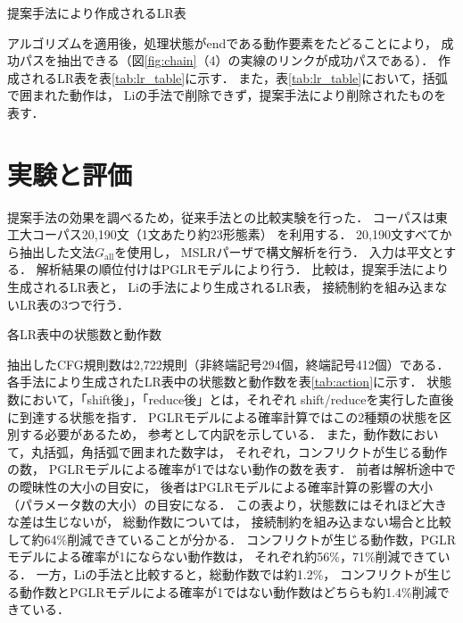 \documentclass[japanese]{jnlp_1.4}
\begin{document}
\begin{table}[b]
  \caption{提案手法により作成されるLR表}
  \label{tab:lr_table}

\end{table}

アルゴリズムを適用後，処理状態がendである動作要素をたどることにより，
成功パスを抽出できる（図\ref{fig:chain}（4）の実線のリンクが成功パスである）．
作成されるLR表を表\ref{tab:lr_table}に示す．
また，表\ref{tab:lr_table}において，括弧で囲まれた動作は，
Liの手法で削除できず，提案手法により削除されたものを表す．




\section{実験と評価}
\label{sec:evaluation}



提案手法の効果を調べるため，従来手法との比較実験を行った．
コーパスは東工大コーパス20,190文（1文あたり約23形態素）
\cite{noro:05} を利用する．
20,190文すべてから抽出した文法$G_{\mbox{all}}$を使用し，
MSLRパーザで構文解析を行う．
入力は平文とする．
解析結果の順位付けはPGLRモデルにより行う．
比較は，提案手法により生成されるLR表と，
Liの手法により生成されるLR表，
接続制約を組み込まないLR表の3つで行う．

\begin{table}[b]
  \caption{各LR表中の状態数と動作数}
  \label{tab:action}

\end{table}

抽出したCFG規則数は2,722規則（非終端記号294個，終端記号412個）である．
各手法により生成されたLR表中の状態数と動作数を表\ref{tab:action}に示す．
状態数において，「shift後」，「reduce後」とは，それぞれ
shift/reduceを実行した直後に到達する状態を指す．
PGLRモデルによる確率計算ではこの2種類の状態を区別する必要があるため，
参考として内訳を示している．
また，動作数において，丸括弧，角括弧で囲まれた数字は，
それぞれ，コンフリクトが生じる動作の数，
PGLRモデルによる確率が1ではない動作の数を表す．
前者は解析途中での曖昧性の大小の目安に，
後者はPGLRモデルによる確率計算の影響の大小（パラメータ数の大小）の目安になる．
この表より，状態数にはそれほど大きな差は生じないが，
総動作数については，
接続制約を組み込まない場合と比較して約64\%削減できていることが分かる．
コンフリクトが生じる動作数，PGLRモデルによる確率が1にならない動作数は，
それぞれ約56\%，71\%削減できている．
一方，Liの手法と比較すると，総動作数では約1.2\%，
コンフリクトが生じる動作数とPGLRモデルによる確率が1ではない動作数はどちらも約1.4\%削減できている．
\end{document}
